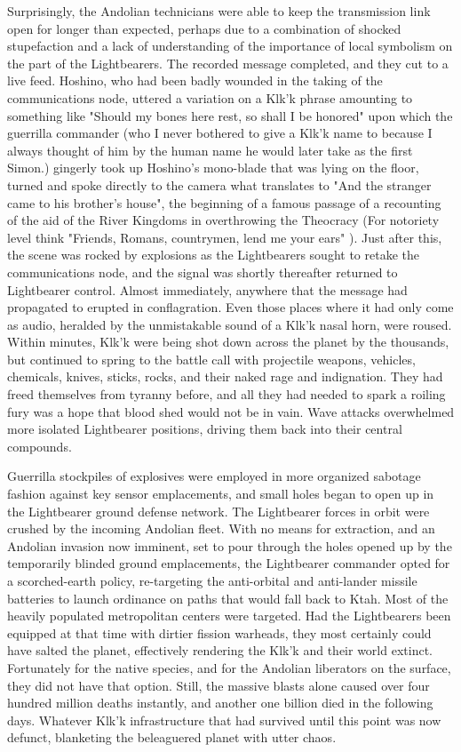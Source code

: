 \begin{itemize}
Surprisingly, the Andolian technicians were able to keep the
transmission link open for longer than expected, perhaps due to a
combination of shocked stupefaction and a lack of understanding of the
importance of local symbolism on the part of the Lightbearers. The
recorded message completed, and they cut to a live feed. Hoshino, who
had been badly wounded in the taking of the communications node,
uttered a variation on a Klk'k phrase amounting to something like
"Should my bones here rest, so shall I be honored" upon which the
guerrilla commander (who I never bothered to give a Klk'k name to
because I always thought of him by the human name he would later take
as the first Simon.) gingerly took up Hoshino's mono-blade that was
lying on the floor, turned and spoke directly to the camera what
translates to "And the stranger came to his brother's house", the
beginning of a famous passage of a recounting of the aid of the River
Kingdoms in overthrowing the Theocracy (For notoriety level think
"Friends, Romans, countrymen, lend me your ears" ). Just after this,
the scene was rocked by explosions as the Lightbearers sought to
retake the communications node, and the signal was shortly thereafter
returned to Lightbearer control. Almost immediately, anywhere that the
message had propagated to erupted in conflagration. Even those places
where it had only come as audio, heralded by the unmistakable sound of
a Klk'k nasal horn, were roused. Within minutes, Klk'k were being shot
down across the planet by the thousands, but continued to spring to
the battle call with projectile weapons, vehicles, chemicals, knives,
sticks, rocks, and their naked rage and indignation. They had freed
themselves from tyranny before, and all they had needed to spark a
roiling fury was a hope that blood shed would not be in vain. Wave
attacks overwhelmed more isolated Lightbearer positions, driving them
back into their central compounds.

Guerrilla stockpiles of explosives were employed in more organized
sabotage fashion against key sensor emplacements, and small holes
began to open up in the Lightbearer ground defense network. The
Lightbearer forces in orbit were crushed by the incoming Andolian
fleet. With no means for extraction, and an Andolian invasion now
imminent, set to pour through the holes opened up by the temporarily
blinded ground emplacements, the Lightbearer commander opted for a
scorched-earth policy, re-targeting the anti-orbital and anti-lander
missile batteries to launch ordinance on paths that would fall back to
Ktah. Most of the heavily populated metropolitan centers were
targeted.  Had the Lightbearers been equipped at that time with
dirtier fission warheads, they most certainly could have salted the
planet, effectively rendering the Klk'k and their world extinct.
Fortunately for the native species, and for the Andolian liberators on
the surface, they did not have that option.  Still, the massive blasts
alone caused over four hundred million deaths instantly, and another
one billion died in the following days.  Whatever Klk'k infrastructure
that had survived until this point was now defunct, blanketing the
beleaguered planet with utter chaos.


\end{itemize}
